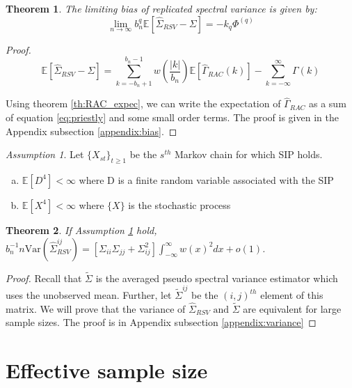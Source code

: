 \documentclass[11pt]{article}
\newcommand{\E}{\mathbb{E}}
\newcommand{\Var}{\text{Var}}
\newtheorem{theorem}{Theorem}
\theoremstyle{remark}
\newtheorem{ass}{Assumption}
\begin{document}
\begin{theorem}\label{th:rsv_bias}
The limiting bias of replicated spectral variance is given by:
\[
 \lim_{n \to \infty}b_n^q\mathbb{E} \left[\hat{\Sigma}_{RSV} - \Sigma \right] = -k_q\Phi^{(q)}
 \]
\end{theorem}

\begin{proof}
\[
\mathbb{E} \left[\hat{\Sigma}_{RSV} - \Sigma \right] = \sum_{k=-b_n+1}^{b_n-1} w\left(\dfrac{|k|}{b_n}\right)\mathbb{E} \left[\hat{\Gamma}_{RAC}(k) \right] - \sum_{k=-\infty}^{\infty}\Gamma(k)
\]

Using theorem \ref{th:RAC_expec}, we can write the expectation of $\hat{\Gamma}_{RAC}$ as  a sum of equation \ref{eq:priestly} and some small order terms.
The proof is given in the Appendix subsection \ref{appendix:bias}.
\end{proof}


\begin{ass} \label{ass:variance_cal}
Let $\{X_{st}\}_{t \geq 1}$ be the $s^{th}$ Markov chain for which SIP holds. 
\begin{enumerate}[a.]
    \item $\E[D^4] < \infty$ where D is a finite random variable associated with the SIP
    \item $\E[X^4] < \infty$ where $\{X\}$ is the stochastic process
\end{enumerate}
\end{ass}


\begin{theorem} \label{th:rsv_variance}
 If Assumption \ref{ass:variance_cal} hold, $b_n^{-1}{n}\Var \left(\hat{\Sigma}_{RSV}^{ij} \right) = [\Sigma_{ii}\Sigma_{jj} + \Sigma_{ij}^2]\int_{-\infty}^{\infty}w(x)^2dx  + o(1)$.
\end{theorem}

\begin{proof}
Recall that $\tilde{\Sigma}$ is the averaged pseudo spectral variance estimator which uses the unobserved mean. Further, let $\tilde{\Sigma}^{ij}$ be the $(i,j)^{th}$ element of this matrix. We will prove that the variance of $\hat{\Sigma}_{RSV} \textrm{ and } \tilde{\Sigma}$ are equivalent for large sample sizes. The proof is in Appendix subsection \ref{appendix:variance}
\end{proof}


\section{Effective sample size} \label{sec:ess}
\end{document}

